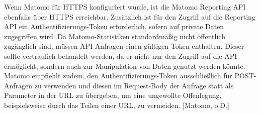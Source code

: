 Wenn Matomo für HTTPS konfiguriert wurde, ist die Matomo Reporting API ebenfalls über HTTPS erreichbar. Zusätzlich ist für den Zugriff auf die Reporting API ein Authentifizierungs-Token erforderlich, sofern auf private Daten zugegriffen wird. Da Matomo-Statistiken standardmäßig nicht öffentlich zugänglich sind, müssen API-Anfragen einen gültigen Token enthalten. Dieser sollte vertraulich behandelt werden, da er nicht nur den Zugriff auf die API ermöglicht, sondern auch zur Manipulation von Daten genutzt werden könnte. Matomo empfiehlt zudem, den Authentifizierungs-Token ausschließlich für POST-Anfragen zu verwenden und diesen im Request-Body der Anfrage statt als Parameter in der URL zu übergeben, um eine ungewollte Offenlegung, beispielsweise durch das Teilen einer URL, zu vermeiden. [Matomo, o.D.]






